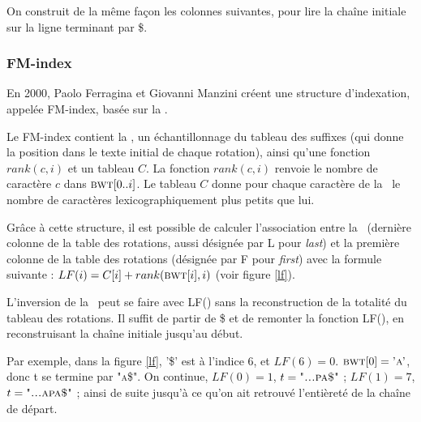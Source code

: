 On construit de la même façon les colonnes suivantes, pour lire la chaîne initiale sur la ligne terminant par \$.

\subsubsection{FM-index}

En 2000, Paolo Ferragina et Giovanni Manzini créent une structure d'indexation, appelée FM-index, basée sur la \bwt.

Le FM-index contient la \bwt, un échantillonnage du tableau des suffixes (qui donne la position dans le texte initial de chaque rotation), ainsi qu'une fonction $rank(c, i)$  et un tableau $C$.
La fonction $rank(c, i)$ renvoie  le nombre de caractère $c$ dans $\textsc{bwt}[0..i]$. Le tableau $C$ donne pour chaque caractère de la \bwt\ le nombre de caractères lexicographiquement plus petits que lui.

Grâce à cette structure, il est possible de calculer l'association entre la \bwt\ (dernière colonne de la table des rotations, aussi désignée par L pour \textit{last}) et la première colonne de la table des rotations (désignée par F pour \textit{first}) avec la formule suivante : $LF(i) = C[i] + rank(\textsc{bwt}[i], i)$ (voir figure \ref{lf}).

L'inversion de la \bwt\ peut se faire avec LF() sans la reconstruction de la totalité du tableau des rotations. 
Il suffit de partir de \$ et de remonter la fonction LF(), en reconstruisant la chaîne initiale jusqu'au début.

Par exemple, dans la figure \ref{lf}, '\$' est à l'indice 6, et $LF(6) = 0$. $\textsc{bwt}[0] = \textsc{'a'}$, donc t se termine par \textsc{"a\$"}. On continue, $LF(0) = 1$, $t = \textsc{"...pa\$"}$ ; $LF(1) = 7$, $t = \textsc{"...apa\$"}$ ; ainsi de suite jusqu'à ce qu'on ait retrouvé l'entièreté de la chaîne de départ.

